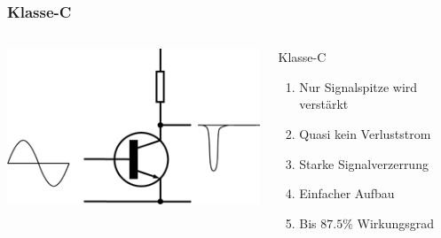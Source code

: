 \begin{frame}
    \frametitle{Klasse-C}
        \begin{columns}[c]
        \column[c]{4cm}
        \begin{center}
            \includegraphics[width=1\textwidth]{a07/Electronic_Amplifier_Class_C.png}\\
            \tiny \hyperlink{refs}{\cite{wm}}
    \end{center}
    \column{5cm} \large
    \begin{block}{Klasse-C}
	    \begin{enumerate} 
			\item Nur Signalspitze wird verstärkt
			\item Quasi kein Verluststrom
			\item Starke Signalverzerrung
			\item Einfacher Aufbau
			\item Bis $87.5\%$ Wirkungsgrad
    	\end{enumerate}
    \end{block}
    \end{columns}
\end{frame}


